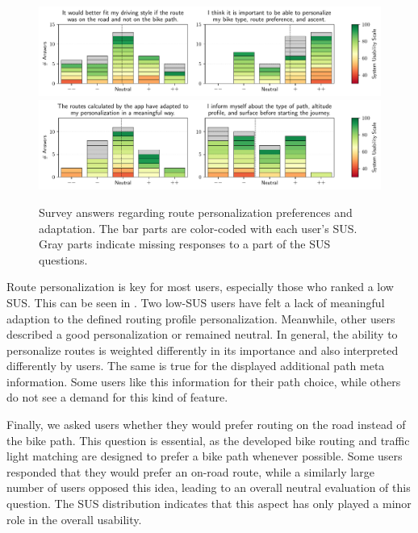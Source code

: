 \begin{figure}[t]
\caption{Survey answers regarding route personalization preferences and adaptation. The bar parts are color-coded with each user's SUS. Gray parts indicate missing responses to a part of the SUS questions.}\label{fig:route-personalization}
\includegraphics[width=\linewidth]{images/app-usability-questions-route-personalization.pdf}
\\
\includegraphics[width=\linewidth]{images/app-usability-questions-route-personalization-adaptation.pdf}
\end{figure}

Route personalization is key for most users, especially those who ranked a low SUS. This can be seen in . Two low-SUS users have felt a lack of meaningful adaption to the defined routing profile personalization. Meanwhile, other users described a good personalization or remained neutral. In general, the ability to personalize routes is weighted differently in its importance and also interpreted differently by users. The same is true for the displayed additional path meta information. Some users like this information for their path choice, while others do not see a demand for this kind of feature. 

Finally, we asked users whether they would prefer routing on the road instead of the bike path. This question is essential, as the developed bike routing and traffic light matching are designed to prefer a bike path whenever possible. Some users responded that they would prefer an on-road route, while a similarly large number of users opposed this idea, leading to an overall neutral evaluation of this question. The SUS distribution indicates that this aspect has only played a minor role in the overall usability.

